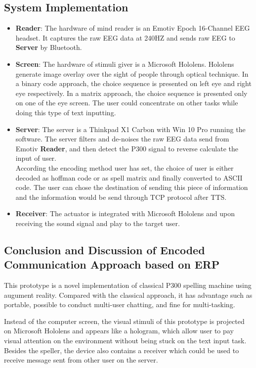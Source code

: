 \documentclass[a4paper]{article}
\begin{document}
\subsection{System Implementation}

\begin{itemize}
    \item \textbf {Reader}: The hardware of mind reader is an Emotiv Epoch 16-Channel EEG headset. It captures the raw EEG data at 240HZ and sends raw EEG to \textbf{Server} by Bluetooth.
    \item \textbf {Screen}: The hardware of stimuli giver is a Microsoft Hololens. Hololens generate image overlay over the sight of people through optical technique. In a binary code approach, the choice sequence is presented on left eye and right eye respectively. In a matrix approach, the choice sequence is presented only on one of the eye screen. The user could concentrate on other tasks while doing this type of text inputting.
    \item \textbf {Server}: The server is a Thinkpad X1 Carbon with Win 10 Pro running the software. The server filters and de-noises the raw EEG data send from Emotiv \textbf{Reader}, and then detect the P300 signal to reverse calculate the input of user. \\
    According the encoding method user has set, the choice of user is either decoded as hoffman code or as spell matrix and finally converted to ASCII code. The user can chose the destination of sending this piece of information and the information would be send through TCP protocol after TTS.   
    \item \textbf{Receiver}: The actuator is integrated with Microsoft Hololens and upon receiving the sound signal and play to the target user.
\end{itemize}

\subsection{Conclusion and Discussion of Encoded Communication Approach based on ERP}

This prototype is a novel implementation of classical P300 spelling machine using augument reality. Compared with the classical approach, it has advantage such as portable, possible to conduct multi-user chatting, and fine for multi-tasking. 

Instead of the computer screen, the visual stimuli of this prototype is projected on Microsoft Hololens and appears like a hologram, which allow user to pay visual attention on the environment without being stuck on the text input task. Besides the speller, the device also contains a receiver which could be used to receive message sent from other user on the server.
\end{document}

